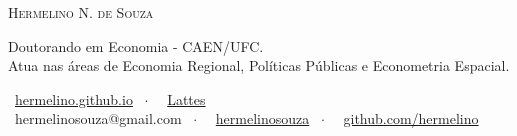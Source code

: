 \documentclass[a4paper,12pt]{article}
\begin{document}
	\par{\centering
		{\huge \textsc{Hermelino N. de Souza}}
		\par}

	\small
	\begin{center}
		Doutorando em Economia - CAEN/UFC. \\
		Atua nas áreas de Economia Regional, Políticas Públicas e Econometria Espacial.
	\end{center}

	\begin{center}
			\small
			\faHome \ \href{https://hermelino.github.io/}{hermelino.github.io} \ $\cdot$ \ \faUniversity \ \href{http://lattes.cnpq.br/3460004816166577}{Lattes}   \\ %
			\faEnvelope \ hermelinosouza@gmail.com \ $\cdot$ \ \faLinkedin \ \href{https://www.linkedin.com/in/hermelinosouza}{hermelinosouza} \ $\cdot$ \ \faGithub \ \href{https://github.com/hermelino}{github.com/hermelino} \\
	\end{center}
\end{document}
